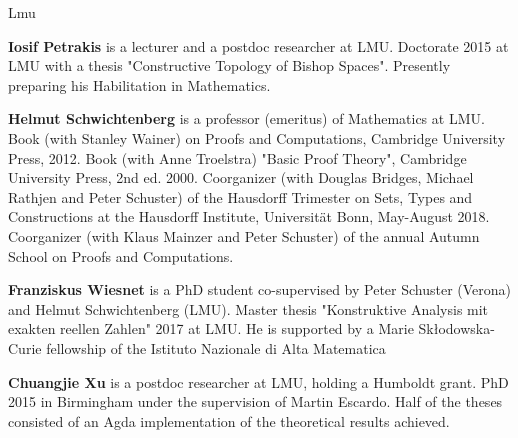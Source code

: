 \begin{sitedescription}{Lmu}
\begin{compactitem}
\item \textbf{Iosif Petrakis} is a lecturer and a postdoc researcher
  at LMU.  Doctorate 2015 at LMU with a thesis "Constructive Topology
  of Bishop Spaces".  Presently preparing his Habilitation in
  Mathematics.

\item \textbf{Helmut Schwichtenberg} is a professor (emeritus) of
  Mathematics at LMU.  Book (with Stanley Wainer) on Proofs and
  Computations, Cambridge University Press, 2012.  Book (with Anne
  Troelstra) "Basic Proof Theory", Cambridge University Press, 2nd
  ed. 2000.  Coorganizer (with Douglas Bridges, Michael Rathjen and
  Peter Schuster) of the Hausdorff Trimester on Sets, Types and
  Constructions at the Hausdorff Institute, Universit\"at Bonn,
  May-August 2018.  Coorganizer (with Klaus Mainzer and Peter
  Schuster) of the annual Autumn School on Proofs and Computations.

\item \textbf{Franziskus Wiesnet} is a PhD student co-supervised by
  Peter Schuster (Verona) and Helmut Schwichtenberg (LMU).  Master
  thesis "Konstruktive Analysis mit exakten reellen Zahlen" 2017 at
  LMU.  He is supported by a Marie Sk{\l}odowska-Curie fellowship of
  the Istituto Nazionale di Alta Matematica

\item \textbf{Chuangjie Xu} is a postdoc researcher at LMU, holding a
  Humboldt grant.  PhD 2015 in Birmingham under the supervision of
  Martin Escardo.  Half of the theses consisted of an Agda
  implementation of the theoretical results achieved.

\end{compactitem}



\end{sitedescription}

